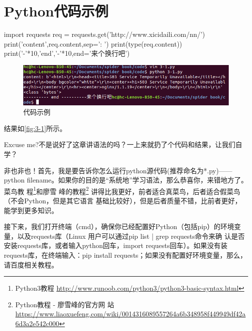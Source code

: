 \documentclass[11pt,UTF8,oneside]{mybook}
\begin{document}

\section{Python代码示例}
\label{sec:Python_code}


\begin{python}
  import requests req = requests.get('http://www.xicidaili.com/nn/')
  print('content',req.content,sep=': ') print(type(req.content))
  print('-'*10,'end','-'*10,end='来个换行吧')
\end{python}


\begin{figure}[htb]
  \centering \includegraphics[width=\textwidth]{./figure/3-1.png}
  \caption{代码示例}
  \label{fig:3-1}
\end{figure}

结果如\autoref{fig:3-1}所示。

Excuse me?不是说好了这章讲语法的吗？一上来就扔了个代码和结果，让我们自
学？

非也非也！首先，我是要告诉你怎么运行python源代码(推荐命名为*.py)——python filename。如果你的目的是“系统地”学习语法，那么恭喜你，来错地方了。菜鸟教
程\footnote{Python3教程
  \url{http://www.runoob.com/python3/python3-basic-syntax.html}}和廖雪
峰的教程\footnote{Python教程 - 廖雪峰的官方网
  站
  \url{https://www.liaoxuefeng.com/wiki/0014316089557264a6b348958f449949df42a6d3a2e542c000}}
讲得比我更好，前者适合真菜鸟，后者适合假菜鸟（不会Python，但是其它语言
基础比较好），但是后者质量不错，比前者更好，能学到更多知识。


接下来，我们打开终端（cmd），确保你已经配置好Python（包括pip）的环境变
量，以及requests库（Linux 用户可以通过pip list | grep requests命令来确
认是否安装requests库，或者输入python回车，import requests回车）。如果没有装requests库，在终端输入：pip install
requests；如果没有配置好环境变量，那么，请百度相关教程。
\end{document}
